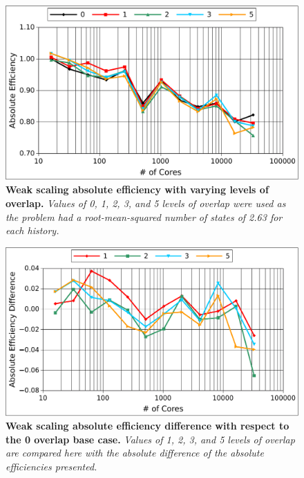 \begin{figure}[t!]
  \begin{center}
    \includegraphics[width=6in]{chapters/parallel_mc/titan_weak_overlap.pdf}
  \end{center}
  \caption{\textbf{Weak scaling absolute efficiency with varying
      levels of overlap.} \textit{Values of 0, 1, 2, 3, and 5 levels
      of overlap were used as the problem had a root-mean-squared
      number of states of 2.63 for each history.}}
  \label{fig:titan_weak_overlap}
\end{figure}

\begin{figure}[t!]
  \begin{center}
    \includegraphics[width=6in]{chapters/parallel_mc/titan_weak_overlap_diff.pdf}
  \end{center}
  \caption{\textbf{Weak scaling absolute efficiency difference with
      respect to the 0 overlap base case.} \textit{Values of 1, 2, 3,
      and 5 levels of overlap are compared here with the absolute
      difference of the absolute efficiencies presented.}}
  \label{fig:titan_weak_overlap_diff}
\end{figure}

